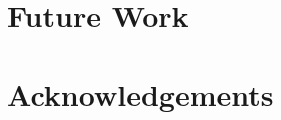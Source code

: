 \documentclass[12pt, a4paper, twoside, titlepage]{article}
\begin{document}


\section{Future Work}


\section{Acknowledgements}



\end{document}
